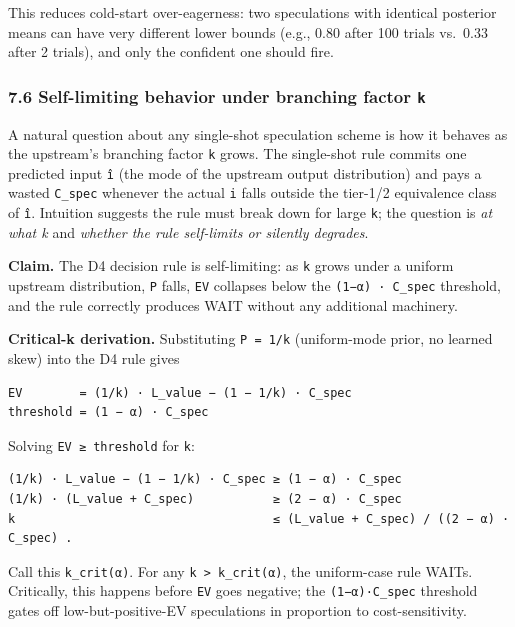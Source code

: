 \documentclass[
  11pt,
]{article}
\begin{document}
This reduces cold-start over-eagerness: two speculations with identical
posterior means can have very different lower bounds (e.g., 0.80 after
100 trials vs.~0.33 after 2 trials), and only the confident one should
fire.

\subsubsection{\texorpdfstring{7.6 Self-limiting behavior under
branching factor
\texttt{k}}{7.6 Self-limiting behavior under branching factor k}}\label{self-limiting-behavior-under-branching-factor-k}

A natural question about any single-shot speculation scheme is how it
behaves as the upstream's branching factor \texttt{k} grows. The
single-shot rule commits one predicted input \texttt{î} (the mode of the
upstream output distribution) and pays a wasted \texttt{C\_spec}
whenever the actual \texttt{i} falls outside the tier-1/2 equivalence
class of \texttt{î}. Intuition suggests the rule must break down for
large \texttt{k}; the question is \emph{at what k} and \emph{whether the
rule self-limits or silently degrades}.

\textbf{Claim.} The D4 decision rule is self-limiting: as \texttt{k}
grows under a uniform upstream distribution, \texttt{P} falls,
\texttt{EV} collapses below the \texttt{(1−α)\ ·\ C\_spec} threshold,
and the rule correctly produces WAIT without any additional machinery.

\textbf{Critical-k derivation.} Substituting \texttt{P\ =\ 1/k}
(uniform-mode prior, no learned skew) into the D4 rule gives

\begin{verbatim}
EV        = (1/k) · L_value − (1 − 1/k) · C_spec
threshold = (1 − α) · C_spec
\end{verbatim}

Solving \texttt{EV\ ≥\ threshold} for \texttt{k}:

\begin{verbatim}
(1/k) · L_value − (1 − 1/k) · C_spec ≥ (1 − α) · C_spec
(1/k) · (L_value + C_spec)           ≥ (2 − α) · C_spec
k                                    ≤ (L_value + C_spec) / ((2 − α) · C_spec) .
\end{verbatim}

Call this \texttt{k\_crit(α)}. For any
\texttt{k\ \textgreater{}\ k\_crit(α)}, the uniform-case rule WAITs.
Critically, this happens before \texttt{EV} goes negative; the
\texttt{(1−α)·C\_spec} threshold gates off low-but-positive-EV
speculations in proportion to cost-sensitivity.
\end{document}
